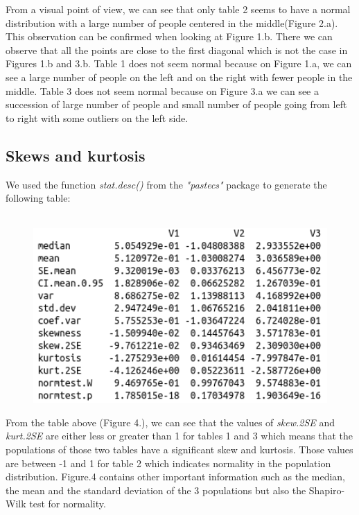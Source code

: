 \documentclass[12pt]{article}
\begin{document}
			From a visual point of view, we can see that only table 2 seems to have a normal distribution with a large number of people centered in the middle(Figure 2.a). This observation can be confirmed when looking at Figure 1.b. There we can observe that all the points are close to the first diagonal which is not the case in Figures 1.b and 3.b.
			Table 1 does not seem normal because on Figure 1.a, we can see a large number of people on the left and on the right with fewer people in the middle.
			Table 3 does not seem normal because on Figure 3.a we can see a succession of large number of people and small number of people going from left to right with some outliers on the left side. 
			
		\subsection{Skews and kurtosis}
			We used the function \textit{stat.desc()} from the \textit{"pastecs"} package to generate the following table:\\\\
			\begin{figure}[H]
				\includegraphics[width=12cm]{stat-desc.png}
				\caption{}
			\end{figure}
		
		From the table above (Figure 4.), we can see that the values of \textit{skew.2SE} and \textit{kurt.2SE} are either less or greater than 1 for tables 1 and 3 which means that the populations of those two tables have a significant skew and kurtosis. Those values are between -1 and 1 for table 2 which indicates normality in the population distribution.
		Figure.4 contains other important information such as the median, the mean and the standard deviation of the 3 populations but also the Shapiro-Wilk test for normality.	
				
\end{document}
